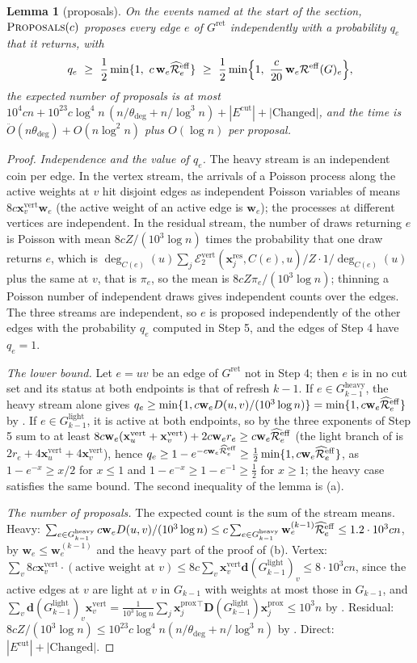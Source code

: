 \documentclass[11pt]{article}
\newtheorem{lemma}[theorem]{Lemma}
\theoremstyle{remark}
\newcommand{\dd}{\mathbf d}
\newcommand{\DD}{\mathbf D}
\newcommand{\ww}{\mathbf w}
\newcommand{\xx}{\mathbf x}
\newcommand{\xxproxy}{\xx^{\mathrm{prox}}}
\newcommand{\xxres}{\xx^{\mathrm{res}}}
\newcommand{\xxvert}{\xx^{\mathrm{vert}}}
\newcommand{\dheavy}{\theta_{\deg}}
\newcommand{\Ecalvert}[1]{\mathcal{E}^{\mathrm{vert}}_{#1}}
\newcommand{\Ecut}{E^{\mathrm{cut}}}
\newcommand{\Gh}{G^{\mathrm{heavy}}}
\newcommand{\Gl}{G^{\mathrm{light}}}
\newcommand{\Gret}{G^{\mathrm{ret}}}
\newcommand{\Rcal}{\mathcal{R}}
\newcommand{\Reff}{\Rcal^{\mathrm{eff}}}
\newcommand{\Reffref}{\mathrlap{\widehat{\phantom{\Rcal}\mkern4mu}}\Rcal^{\mathrm{eff}}}
\newcommand{\Odouble}{\ddot{O}}
\begin{document}
\begin{lemma}[proposals]\label{lem:proposals}
On the events named at the start of the section, $\textsc{Proposals}(c)$
proposes every edge $e$ of $\Gret$ independently with a probability $q_e$
that it returns, with
\[
q_e\ \ge\ \frac12\min\{1,\ c\,\ww_e\Reffref_e\}\ \ge\ \frac12\min\Bigl\{1,\ \frac{c}{20}\,\ww_e\Reff(G)_e\Bigr\},
\]
the expected number of proposals is at most
$10^{4}cn+10^{23}c\log^{4}n\,(n/\dheavy+n/\log^{3}n)+|\Ecut|+|\mathrm{Changed}|$, and
the time is $\Odouble(n\dheavy)+O(n\log^{2}n)$ plus $O(\log n)$ per proposal.
\end{lemma}
\begin{proof}
\emph{Independence and the value of $q_e$.}
The heavy stream is an independent coin per edge.
In the vertex stream, the arrivals of a Poisson process along the active
weights at $v$ hit disjoint edges as independent Poisson variables of means
$8c\xxvert_v\ww_e$ (the active weight of an active edge is $\ww_e$); the
processes at different vertices are independent.
In the residual stream, the number of draws returning $e$ is Poisson with
mean $8cZ/(10^{3}\log n)$ times the probability that one draw returns $e$,
which is $\deg_{C(e)}(u)\sum_j\Ecalvert2(\xxres_j,C(e),u)/Z\cdot1/\deg_{C(e)}(u)$
plus the same at $v$, that is $\pi_e$, so the mean is $8cZ\pi_e/(10^{3}\log n)$;
thinning a Poisson number of independent draws gives independent counts
over the edges.
The three streams are independent, so $e$ is proposed independently of the
other edges with the probability $q_e$ computed in Step 5, and the edges of
Step 4 have $q_e=1$.

\emph{The lower bound.}
Let $e=uv$ be an edge of $\Gret$ not in Step 4; then $e$ is in no cut set
and its status at both endpoints is that of refresh $k-1$.
If $e\in\Gh_{k-1}$, the heavy stream alone gives
$q_e\ge\min\{1,c\ww_eD(u,v)/(10^{3}\log n)\}=\min\{1,c\ww_e\Reffref_e\}$ by
.
If $e\in\Gl_{k-1}$, it is active at both endpoints, so by 
the three exponents of Step 5 sum to at least
$8c\ww_e(\xxvert_u+\xxvert_v)+2c\ww_er_e\ge c\ww_e\Reffref_e$ (the light branch of
 is $2r_e+4\xxvert_u+4\xxvert_v$), hence
$q_e\ge1-e^{-c\ww_e\Reffref_e}\ge\frac12\min\{1,c\ww_e\Reffref_e\}$, as
$1-e^{-x}\ge x/2$ for $x\le1$ and $1-e^{-x}\ge1-e^{-1}\ge\frac12$ for $x\ge1$;
the heavy case satisfies the same bound.
The second inequality of the lemma is (a).

\emph{The number of proposals.}
The expected count is the sum of the stream means.
Heavy: $\sum_{e\in\Gh_{k-1}}c\ww_eD(u,v)/(10^{3}\log n)\le c\sum_{e\in\Gh_{k-1}}\ww^{(k-1)}_e\Reffref_e\le1.2\cdot10^{3}cn$,
by $\ww_e\le\ww^{(k-1)}_e$ and the heavy part of the proof of
(b).
Vertex: $\sum_v8c\xxvert_v\cdot(\text{active weight at }v)\le8c\sum_v\xxvert_v\dd(\Gl_{k-1})_v\le8\cdot10^{3}cn$,
since the active edges at $v$ are light at $v$ in $G_{k-1}$ with weights at
most those in $G_{k-1}$, and
$\sum_v\dd(\Gl_{k-1})_v\xxvert_v=\frac1{10^{3}\log n}\sum_j\xxproxy_j{}^{\top}\DD(\Gl_{k-1})\xxproxy_j\le10^{3}n$
by .
Residual: $8cZ/(10^{3}\log n)\le10^{23}c\log^{4}n(n/\dheavy+n/\log^{3}n)$ by
.
Direct: $|\Ecut|+|\mathrm{Changed}|$.


\end{proof}
\end{document}
